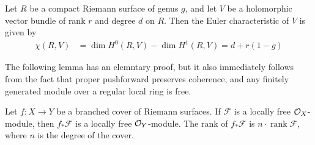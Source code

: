 \documentclass[12pt]{article}
\begin{document}
\begin{theorem}
     Let $R$ be a compact Riemann surface of genus $g$, and let $V$ be a holomorphic vector bundle of rank $r$ and degree $d$ on $R$. Then the Euler characteristic of $V$ is given by \begin{align*}
        \chi(R,V) & = \dim H^0(R,V) - \dim H^1(R,V) = d + r(1-g)
    \end{align*}
\end{theorem}

The following lemma has an elemntary proof, but it also immediately follows from the fact that proper pushforward preserves coherence, and any finitely generated module over a regular local ring is free.

\begin{lemma}
    Let $f : X \to Y$ be a branched cover of Riemann surfaces.
    If $\mathcal{F}$ is a locally free ${\mathcal{O}}_X$-module,
    then $f_*\mathcal{F}$ is a locally free ${\mathcal{O}}_Y$-module. The rank of $f_*\mathcal{F}$ is
    $n \cdot \operatorname{rank}\mathcal{F}$, where $n$ is the degree of the cover.
\end{lemma}
\end{document}
